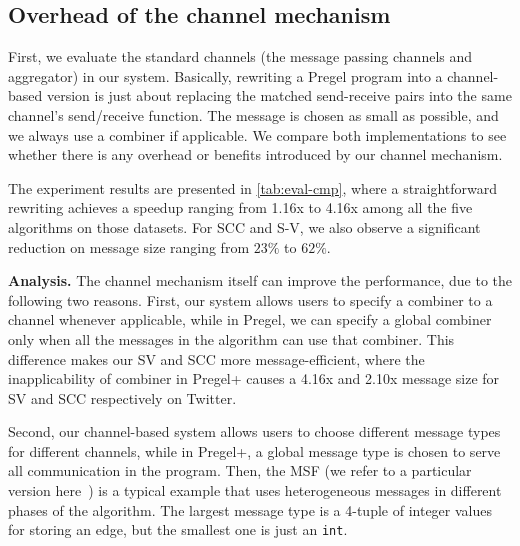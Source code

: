 \documentclass{sokendai_thesis} %
\newcommand{\PP}{Pregel+}
\begin{document}
\subsection{Overhead of the channel mechanism}
\label{sec:eval-channel}

First, we evaluate the standard channels (the message passing channels and aggregator) in our system.
Basically, rewriting a Pregel program into a channel-based version is just about replacing the matched send-receive pairs into the same channel's send/receive function.
The message is chosen as small as possible, and we always use a combiner if applicable.
We compare both implementations to see whether there is any overhead or benefits introduced by our channel mechanism.

The experiment results are presented in \autoref{tab:eval-cmp}, where a straightforward rewriting achieves a speedup ranging from 1.16x to 4.16x among all the five algorithms on those datasets.
For SCC and S-V, we also observe a significant reduction on message size ranging from $23\%$ to $62\%$.

\textbf{Analysis.}
The channel mechanism itself can improve the performance, due to the following two reasons.
First, our system allows users to specify a combiner to a channel whenever applicable, %
while in Pregel, we can specify a global combiner only when all the messages in the algorithm can use that combiner.
This difference makes our SV and SCC more message-efficient,
where the inapplicability of combiner in \PP{} causes a 4.16x and 2.10x message size for SV and SCC respectively on Twitter.

Second, our channel-based system allows users to choose different message types for different channels, while in \PP{}, a global message type is chosen to serve all communication in the program.
Then, the MSF (we refer to a particular version here~\cite{boruvka}) is a typical example that uses heterogeneous messages in different phases of the algorithm.
The largest message type is a 4-tuple of integer values for storing an edge, but the smallest one is just an \texttt{int}.

\end{document}
